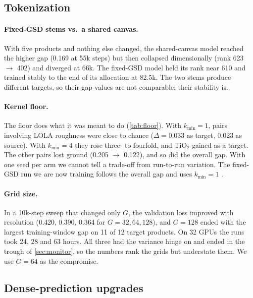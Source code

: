 \subsection{Tokenization}
\label{sec:exp_tokens}

\paragraph{Fixed-GSD stems vs.\ a shared canvas.} With five products and nothing else changed, the shared-canvas model reached the higher gap (0.169 at 55k steps) but then collapsed dimensionally (rank 623 $\to$ 402) and diverged at 66k. The fixed-GSD model held its rank near 610 and trained stably to the end of its allocation at 82.5k. The two stems produce different targets, so their gap values are not comparable; their stability is.

\paragraph{Kernel floor.} The floor does what it was meant to do (\cref{tab:floor}). With $k_{\min}{=}1$, pairs involving LOLA roughness were close to chance ($\Delta{=}0.033$ as target, 0.023 as source). With $k_{\min}{=}4$ they rose three- to fourfold, and TiO$_2$ gained as a target. The other pairs lost ground (0.205 $\to$ 0.122), and so did the overall gap. With one seed per arm we cannot tell a trade-off from run-to-run variation. The fixed-GSD run we are now training follows the overall gap and uses $k_{\min}{=}1$ .



\paragraph{Grid size.} In a 10k-step sweep that changed only $G$, the validation loss improved with resolution (0.420, 0.390, 0.364 for $G{=}32, 64, 128$), and $G{=}128$ ended with the largest training-window gap on 11 of 12 target products. On 32 GPUs the runs took 24, 28 and 63 hours. All three had the variance hinge on and ended in the trough of \cref{sec:monitor}, so the numbers rank the grids but understate them. We use $G{=}64$ as the compromise.

\subsection{Dense-prediction upgrades}
\label{sec:exp_dense}

